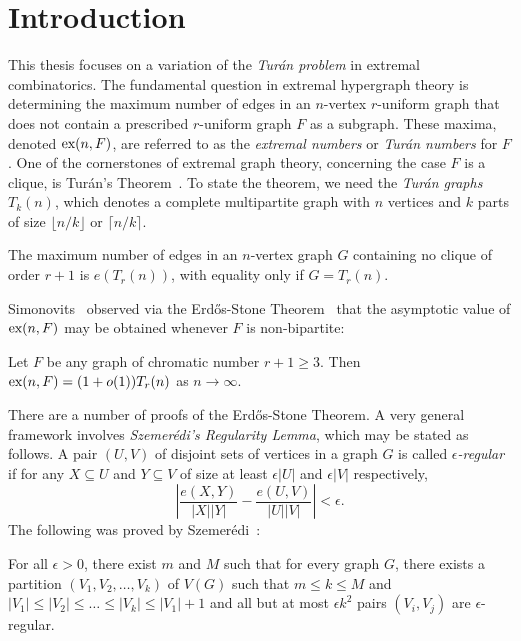 \section{Introduction}

This thesis focuses on a variation of the \textit{Turán problem} in extremal combinatorics.  The fundamental question in extremal hypergraph theory is determining the maximum number of edges in an $n$-vertex $r$-uniform graph that does not contain a prescribed $r$-uniform graph $F$ as a subgraph. These maxima, denoted $\textnormal{ex}(n, F)$, are referred to as the \textit{extremal numbers} or \textit{Turán numbers} for $F$. One of the cornerstones of extremal graph theory, concerning the case $F$ is a clique, is Tur\'{a}n's Theorem~\cite{Turan1941}. To state the theorem, we need the \textit{Tur\'{a}n graphs} $T_k(n)$, which denotes a complete multipartite graph with $n$ vertices and $k$ parts of size $\lfloor n/k\rfloor$ or $\lceil n/k\rceil$. 

\begin{oldtheorem}\label{thm:turan}
The maximum number of edges in an $n$-vertex graph $G$ containing no clique of order $r + 1$ is $e(T_r(n))$, with equality only if $G = T_r(n)$.
\end{oldtheorem}

Simonovits~\cite{ErdosSimonovits1966} observed via the Erd\H{o}s-Stone Theorem~\cite{ErdosStone1946} that the asymptotic value of $\textnormal{ex}(n, F)$ may be obtained whenever $F$ is non-bipartite:

\begin{oldtheorem}\label{thm:ess}
Let $F$ be any graph of chromatic number $r + 1 \geq 3$. Then $\textnormal{ex}(n, F) = (1 + o(1))T_r(n)$ as $n \rightarrow \infty$.
\end{oldtheorem}

There are a number of proofs of the Erd\H{o}s-Stone Theorem. A very general framework involves \textit{Szemer\'{e}di's Regularity Lemma}, which may be stated as follows. A pair $(U,V)$ of disjoint sets of vertices in a graph $G$ is called \textit{$\epsilon$-regular} if for any $X \subseteq U$ and $Y \subseteq V$ of size at least $\epsilon |U|$ and $\epsilon|V|$ respectively, 
\[
  \left|\frac{e(X, Y)}{|X||Y|} - \frac{e(U, V)}{|U||V|}\right| < \epsilon.
\]
The following was proved by Szemer\'{e}di~\cite{Szemeredi1978}:

\begin{oldtheorem} 
For all $\epsilon > 0$, there exist $m$ and $M$ such that for every graph $G$, there exists a partition $(V_1, V_2, \dots, V_k)$ of $V(G)$ such that $m \leq k \leq M$ and $|V_1| \leq |V_2| \leq \dots \leq |V_k| \leq |V_1| + 1$ and all but at most $\epsilon k^2$ pairs $(V_i, V_j)$ are $\epsilon$-regular. 
\end{oldtheorem}


